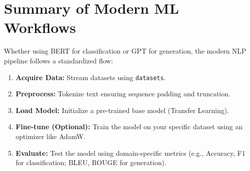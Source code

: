 \section*{Summary of Modern ML Workflows}
Whether using BERT for classification or GPT for generation, the modern NLP pipeline follows a standardized flow:
\begin{enumerate}
    \item \textbf{Acquire Data:} Stream datasets using \texttt{datasets}.
    \item \textbf{Preprocess:} Tokenize text ensuring sequence padding and truncation.
    \item \textbf{Load Model:} Initialize a pre-trained base model (Transfer Learning).
    \item \textbf{Fine-tune (Optional):} Train the model on your specific dataset using an optimizer like AdamW.
    \item \textbf{Evaluate:} Test the model using domain-specific metrics (e.g., Accuracy, F1 for classification; BLEU, ROUGE for generation).
\end{enumerate}
